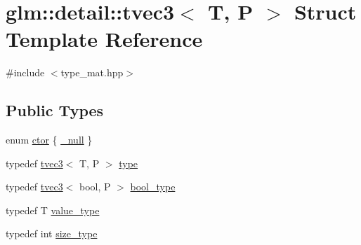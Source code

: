 \hypertarget{structglm_1_1detail_1_1tvec3}{}\section{glm\+:\+:detail\+:\+:tvec3$<$ T, P $>$ Struct Template Reference}
\label{structglm_1_1detail_1_1tvec3}


{\ttfamily \#include $<$type\+\_\+mat.\+hpp$>$}

\subsection*{Public Types}
\begin{DoxyCompactItemize}
\item 
enum \hyperlink{structglm_1_1detail_1_1tvec3_a370bdb3bb793461504b1387daec78083}{ctor} \{ \hyperlink{structglm_1_1detail_1_1tvec3_a370bdb3bb793461504b1387daec78083a3aebaa53efa0b8ea65cd3daeeb23593f}{\+\_\+null}
 \}
\item 
typedef \hyperlink{structglm_1_1detail_1_1tvec3}{tvec3}$<$ T, P $>$ \hyperlink{structglm_1_1detail_1_1tvec3_acd2bae8742f34efdb3605e8399b5e7c1}{type}
\item 
typedef \hyperlink{structglm_1_1detail_1_1tvec3}{tvec3}$<$ bool, P $>$ \hyperlink{structglm_1_1detail_1_1tvec3_aabd96f8052cc3964f695e9307a4ad403}{bool\+\_\+type}
\item 
typedef T \hyperlink{structglm_1_1detail_1_1tvec3_aebabd0d52c43d26ee4d66ba4606eb03c}{value\+\_\+type}
\item 
typedef int \hyperlink{structglm_1_1detail_1_1tvec3_a9c82390594a6adc72db5533c2f1013a4}{size\+\_\+type}
\end{DoxyCompactItemize}
